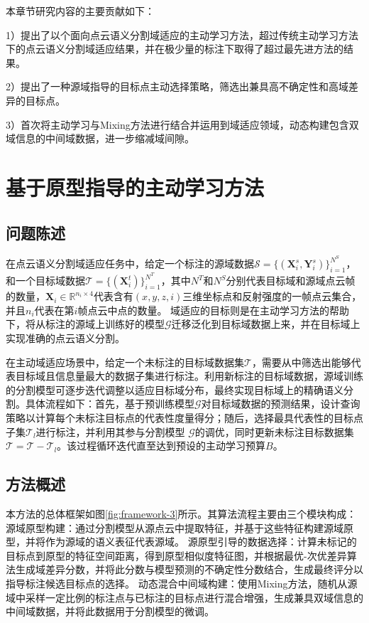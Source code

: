 

本章节研究内容的主要贡献如下：

1）提出了以个面向点云语义分割域适应的主动学习方法，超过传统主动学习方法下的点云语义分割域适应结果，并在极少量的标注下取得了超过最先进方法的结果。

2）提出了一种源域指导的目标点主动选择策略，筛选出兼具高不确定性和高域差异的目标点。

3）首次将主动学习与Mixing方法进行结合并运用到域适应领域，动态构建包含双域信息的中间域数据，进一步缩减域间隙。


\section{基于原型指导的主动学习方法}
\subsection{问题陈述}
在点云语义分割域适应任务中，给定一个标注的源域数据\(\mathcal{S} = \{(\mathbf{X}_i^s, \mathbf{Y}_i^s)\}_{i=1}^{N^S}\)，和一个目标域数据$\mathcal{T} = \{(\mathbf{X}_i^t)\}_{i=1}^ {N^T}$，其中\(N^T\)和\(N^S\)分别代表目标域和源域点云帧的数量，$\mathbf{X}_i \in \mathbb{R}^{{n_i} \times 4}$代表含有$(x,y,z,i)$三维坐标点和反射强度的一帧点云集合，并且$n_i$代表在第$i$帧点云中点的数量。 域适应的目标则是在主动学习方法的帮助下，将从标注的源域上训练好的模型$\mathcal{G}$迁移泛化到目标域数据上来，并在目标域上实现准确的点云语义分割。

在主动域适应场景中，给定一个未标注的目标域数据集$\mathcal{T}$，需要从中筛选出能够代表目标域且信息量最大的数据子集进行标注。利用新标注的目标域数据，源域训练的分割模型可逐步迭代调整以适应目标域分布，最终实现目标域上的精确语义分割。具体流程如下：首先，基于预训练模型$\mathcal{G}$对目标域数据的预测结果，设计查询策略以计算每个未标注目标点的代表性度量得分；随后，选择最具代表性的目标点子集\(\mathcal{T}_l\)进行标注，并利用其参与分割模型 $\mathcal{G}$的调优，同时更新未标注目标数据集\(\mathcal{T}=\mathcal{T}-\mathcal{T}_l\)。该过程循环迭代直至达到预设的主动学习预算$B$。 
\subsection{方法概述}
本方法的总体框架如图\ref{fig:framework-3}所示。其算法流程主要由三个模块构成：
源域原型构建：通过分割模型从源点云中提取特征，并基于这些特征构建源域原型，并将作为源域的语义表征代表源域。
源原型引导的数据选择：计算未标记的目标点到原型的特征空间距离，得到原型相似度特征图，并根据最优-次优差异算法生成域差异分数，并将此分数与模型预测的不确定性分数结合，生成最终评分以指导标注候选目标点的选择。
动态混合中间域构建：使用Mixing方法，随机从源域中采样一定比例的标注点与已标注的目标点进行混合增强，生成兼具双域信息的中间域数据，并将此数据用于分割模型的微调。

